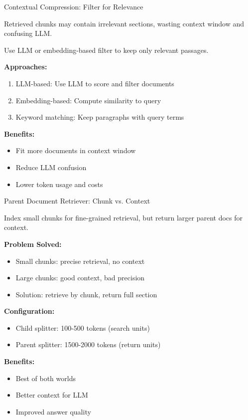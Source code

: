 \documentclass[aspectratio=169,11pt]{beamer}
\begin{document}
\begin{frame}{Contextual Compression: Filter for Relevance}
  \begin{warningbox}[Problem]
    Retrieved chunks may contain irrelevant sections, wasting context window and confusing LLM.
  \end{warningbox}

  \begin{conceptbox}[Solution]
    Use LLM or embedding-based filter to keep only relevant passages.
  \end{conceptbox}

  \textbf{Approaches:}
  \begin{enumerate}
    \setlength{\itemsep}{0pt}
    \item LLM-based: Use LLM to score and filter documents
    \item Embedding-based: Compute similarity to query
    \item Keyword matching: Keep paragraphs with query terms
  \end{enumerate}

  \textbf{Benefits:}
  \begin{itemize}
    \setlength{\itemsep}{1pt}
    \item Fit more documents in context window
    \item Reduce LLM confusion
    \item Lower token usage and costs
  \end{itemize}
\end{frame}

\begin{frame}{Parent Document Retriever: Chunk vs. Context}
  \begin{conceptbox}[Idea]
    Index small chunks for fine-grained retrieval, but return larger parent docs for context.
  \end{conceptbox}

  \textbf{Problem Solved:}
  \begin{itemize}
    \setlength{\itemsep}{1pt}
    \item Small chunks: precise retrieval, no context
    \item Large chunks: good context, bad precision
    \item Solution: retrieve by chunk, return full section
  \end{itemize}

  \textbf{Configuration:}
  \begin{itemize}
    \setlength{\itemsep}{1pt}
    \item Child splitter: 100-500 tokens (search units)
    \item Parent splitter: 1500-2000 tokens (return units)
  \end{itemize}

  \textbf{Benefits:}
  \begin{itemize}
    \setlength{\itemsep}{1pt}
    \item Best of both worlds
    \item Better context for LLM
    \item Improved answer quality
  \end{itemize}
\end{frame}
\end{document}
